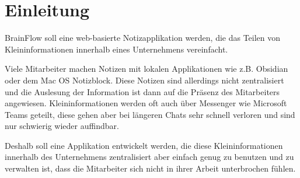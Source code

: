 \section{Einleitung}
BrainFlow soll eine web-basierte Notizapplikation werden, die das Teilen von Kleininformationen innerhalb eines Unternehmens vereinfacht.

\bigskip\noindent
Viele Mitarbeiter machen Notizen mit lokalen Applikationen wie z.B. Obsidian oder dem Mac OS Notizblock.
Diese Notizen sind allerdings nicht zentralisiert und die Auslesung der Information ist dann auf die Präsenz des Mitarbeiters angewiesen.
Kleininformationen werden oft auch über Messenger wie Microsoft Teams geteilt, diese gehen aber bei längeren Chats sehr schnell verloren
und sind nur schwierig wieder auffindbar.

\bigskip\noindent
Deshalb soll eine Applikation entwickelt werden, die diese Kleininformationen innerhalb des Unternehmens zentralisiert aber einfach genug
zu benutzen und zu verwalten ist, dass die Mitarbeiter sich nicht in ihrer Arbeit unterbrochen fühlen.